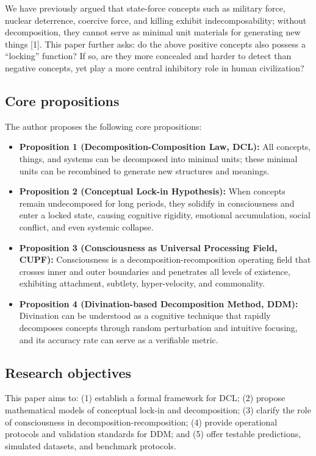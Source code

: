 \documentclass[11pt,a4paper]{article}
\begin{document}
We have previously argued that state-force concepts such as military force, nuclear deterrence, coercive force, and killing exhibit indecomposability; without decomposition, they cannot serve as minimal unit materials for generating new things [1]. This paper further asks: do the above positive concepts also possess a ``locking'' function? If so, are they more concealed and harder to detect than negative concepts, yet play a more central inhibitory role in human civilization?

\subsection{Core propositions}

The author proposes the following core propositions:

\begin{itemize}
    \item \textbf{Proposition 1 (Decomposition-Composition Law, DCL):} All concepts, things, and systems can be decomposed into minimal units; these minimal units can be recombined to generate new structures and meanings.
    \item \textbf{Proposition 2 (Conceptual Lock-in Hypothesis):} When concepts remain undecomposed for long periods, they solidify in consciousness and enter a locked state, causing cognitive rigidity, emotional accumulation, social conflict, and even systemic collapse.
    \item \textbf{Proposition 3 (Consciousness as Universal Processing Field, CUPF):} Consciousness is a decomposition-recomposition operating field that crosses inner and outer boundaries and penetrates all levels of existence, exhibiting attachment, subtlety, hyper-velocity, and commonality.
    \item \textbf{Proposition 4 (Divination-based Decomposition Method, DDM):} Divination can be understood as a cognitive technique that rapidly decomposes concepts through random perturbation and intuitive focusing, and its accuracy rate can serve as a verifiable metric.
\end{itemize}

\subsection{Research objectives}

This paper aims to: (1) establish a formal framework for DCL; (2) propose mathematical models of conceptual lock-in and decomposition; (3) clarify the role of consciousness in decomposition-recomposition; (4) provide operational protocols and validation standards for DDM; and (5) offer testable predictions, simulated datasets, and benchmark protocols.
\end{document}
